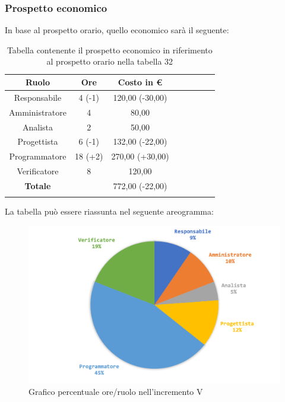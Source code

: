 		\subsubsection{Prospetto economico}
			In base al prospetto orario, quello economico sarà il seguente: 
			
			\begin{longtable}{|c|c|c|c|c|c|c|c}
				\hline
				\rowcolor{lighter-grayer}
				\textbf{Ruolo} & \textbf{Ore} & \textbf{Costo in €} \\
				\hline
				\endfirsthead
				\hline
			Responsabile 	    & 4 (-1) & 120,00 (-30,00)\\
			\hline 
			\hline
			Amministratore	  & 4 & 80,00\\
			\hline
			\hline
			Analista 				& 2 & 50,00\\
			\hline
			\hline
			Progettista 		  & 6 (-1) & 132,00 (-22,00)\\
			\hline
			\hline
			Programmatore 	 & 18 (+2) & 270,00 (+30,00)\\
			\hline
			\hline
			Verificatore 		  & 8 & 120,00\\
			\hline
			\textbf{Totale} 	&  & 772,00 (-22,00)\\
			\hline
				
				\caption{Tabella contenente il prospetto economico in riferimento al prospetto orario nella tabella 32}
			\end{longtable}
			\pagebreak
			
			La tabella può essere riassunta nel seguente areogramma:
			\begin{figure}[H]
				\centering
				\includegraphics[width=0.8\linewidth]{images/consuntivo/ConsIncr5-2.png}
				\caption{Grafico percentuale ore/ruolo nell'incremento V}
				\label{fig:grafico costi ruolo incremento V}
			\end{figure}

